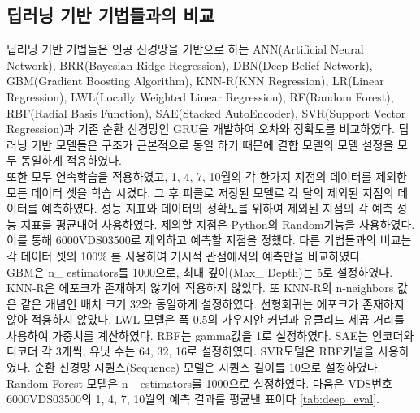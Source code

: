 \documentclass[11pt]{report}
\begin{document}
\subsection{딥러닝 기반 기법들과의 비교}
딥러닝 기반 기법들은 인공 신경망을 기반으로 하는 ANN(Artificial Neural Network), BRR(Bayesian Ridge Regression), 
DBN(Deep Belief Network), GBM(Gradient Boosting Algorithm), KNN-R(KNN Regression), LR(Linear Regression), 
LWL(Locally Weighted Linear Regression), RF(Random Forest), 
RBF(Radial Basis Function), SAE(Stacked AutoEncoder), SVR(Support Vector Regression)과 기존 순환 신경망인 GRU을 개발하여 오차와 정확도를 비교하였다. 
딥러닝 기반 모델들은 구조가 근본적으로 동일 하기 때문에 결합 모델의 모델 설정을 모두 동일하게 적용하였다. \\
\indent 또한 모두 연속학습을 적용하였고, 1, 4, 7, 10월의 각 한가지 지점의 데이터를 제외한 모든 데이터 셋을 학습 시켰다. 그 후 피클로 저장된 모델로 각 달의 제외된 지점의 데이터를 예측하였다. 
성능 지표와 데이터의 정확도를 위하여 제외된 지점의 각 예측 성능 지표를 평균내어 사용하였다. 제외할 지점은 Python의 Random기능을 사용하였다. 이를 통해 6000VDS03500로 제외하고 예측할 지점을 정했다.
다른 기법들과의 비교는 각 데이터 셋의 100\% 를 사용하여 거시적 관점에서의 예측만을 비교하였다. \\
\indent GBM은 n\_ estimators를 1000으로, 최대 깊이(Max\_ Depth)는 5로 설정하였다. KNN-R은 에포크가 존재하지 않기에 적용하지 않았다. 또 KNN-R의 n-neighbors 값은 같은 개념인 배치 크기 32와 동일하게 설정하였다. 
선형회귀는 에포크가 존재하지 않아 적용하지 않았다. LWL 모델은 폭 0.5의 가우시안 커널과 유클리드 제곱 거리를 사용하여 가중치를 계산하였다. RBF는 gamma값을 1로 설정하였다. SAE는 인코더와 디코더 각 3개씩, 유닛 수는 64, 32, 16로 설정하였다. 
SVR모델은 RBF커널을 사용하였다. 순환 신경망 시퀀스(Sequence) 모델은 시퀀스 길이를 10으로 설정하였다. Random Forest 모델은 n\_ estimators를 1000으로 설정하였다. 
\indent 다음은 VDS번호 6000VDS03500의 1, 4, 7, 10월의 예측 결과를 평균낸 표이다 \autoref{tab:deep_eval}.

\newpage
\end{document}

